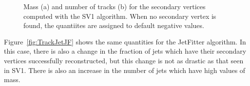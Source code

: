 \begin{figure}[h!]
   \caption{Mass (a) and number of tracks (b) for the secondary vertices computed with the SV1 algorithm. When no secondary vertex is found, the quantiites are assigned to default negative values.}
  \label{fig:TrackJetSV1}
\end{figure}

Figure~\ref{fig:TrackJetJF} shows the same quantities for the JetFitter algorithm. In this case, there is also a change in the fraction of jets which have their secondary vertices successfully reconstructed, but this change is not as drastic as that seen in SV1. There is also an increase in the number of jets which have high values of mass. 

\begin{figure}[h!]
  \centering
  \captionsetup{justification=centering}


\end{figure}
